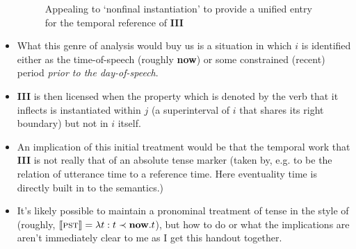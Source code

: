 \documentclass[11pt,dvipsnames]{article}
\begin{document}
\begin{itemize}
\begin{figure}[H]
	\caption{Appealing to `nonfinal instantiation' to provide a unified entry for the temporal reference of \textbf{III}}
	
	
\end{figure}
	
	\item What this genre of analysis would buy us is a situation in which $i$ is identified either as the time-of-speech (roughly \textbf{now}) or some constrained (recent) period \textit{prior to the day-of-speech}.
	
	
	\item \textbf{III} is then licensed when the property which is denoted by the verb that it inflects is instantiated within $j$ (a superinterval of $i$ that shares its right boundary) but not in $i$ itself.
	
	
	
	
	\item An implication of this initial treatment would be that the temporal work that \textbf{III} is not really that of an absolute tense marker (taken by, e.g. \citealt{Klein2009} to be the relation of utterance time to a reference time. Here eventuality time is directly built in to the semantics.)
	\
	\item It's likely possible to maintain a pronominal treatment of tense in the style of \citet{Partee1973} (roughly, $\llbracket\textsc{pst}\rrbracket=\lambda t:t\prec\textbf{now}.t$), but how to do or what the implications are aren't immediately clear to me as I get this handout together.
	

\end{itemize}
\end{document}
